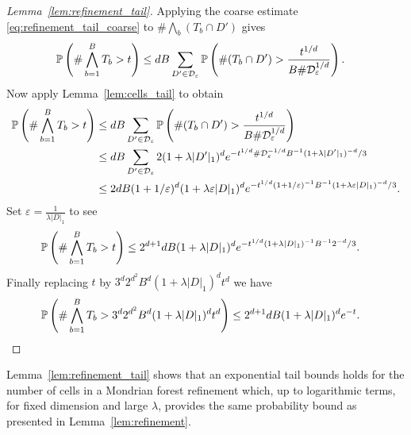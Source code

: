 \begin{proof}[Lemma~\ref{lem:refinement_tail}]
  Applying the coarse estimate \eqref{eq:refinement_tail_coarse}
  to $\# \bigwedge_b (T_b \cap D')$ gives
  \begin{align*}
    \P\left(
      \# \bigwedge_{b=1}^B T_b
      > t
    \right)
    &\leq
    d B \sum_{D' \in \cD_\varepsilon}
    \P\left(
      \# (T_b \cap D')
      > \frac{t^{1/d}}{B \# \cD_\varepsilon^{1/d}}
    \right).
  \end{align*}
  Now apply Lemma~\ref{lem:cells_tail} to obtain
  \begin{align*}
    \P\left(
      \# \bigwedge_{b=1}^B T_b
      > t
    \right)
    &\leq
    d B \sum_{D' \in \cD_\varepsilon}
    \P\left(
      \# (T_b \cap D')
      > \frac{t^{1/d}}{B \# \cD_\varepsilon^{1/d}}
    \right) \\
    &\leq
    d B \sum_{D' \in \cD_\varepsilon}
    2 (1 + \lambda |D'|_1)^d
    e^{- t^{1/d} \# \cD_\varepsilon^{-1/d} B^{-1}
    (1 + \lambda |D'|_1)^{-d} / 3} \\
    &\leq
    2 d B (1 + 1 / \varepsilon)^d
    (1 + \lambda \varepsilon |D|_1)^d
    e^{- t^{1/d} (1 + 1/\varepsilon)^{-1} B^{-1}
    (1 + \lambda \varepsilon |D|_1)^{-d} / 3}.
  \end{align*}
  Set $\varepsilon = \frac{1}{\lambda |D|_1}$ to see
  \begin{align*}
    \P\left(
      \# \bigwedge_{b=1}^B T_b
      > t
    \right)
    &\leq
    2^{d+1} d B (1 + \lambda |D|_1)^d
    e^{- t^{1/d} (1 + \lambda |D|_1)^{-1} B^{-1} 2^{-d} / 3}.
  \end{align*}
  Finally replacing $t$ by $3^d 2^{d^2} B^d (1+\lambda|D|_1)^d t^d$ we have
  \begin{align*}
    \P\left(
      \# \bigwedge_{b=1}^B T_b
      > 3^d 2^{d^2} B^d (1+\lambda|D|_1)^d t^d
    \right)
    &\leq
    2^{d+1} d B (1 + \lambda |D|_1)^d e^{-t}.
  \end{align*}
\end{proof}

Lemma~\ref{lem:refinement_tail} shows that
an exponential tail bounds holds for
the number of cells in a Mondrian forest refinement
which, up to logarithmic terms, for fixed dimension and large $\lambda$,
provides the same probability bound as presented in Lemma~\ref{lem:refinement}.
